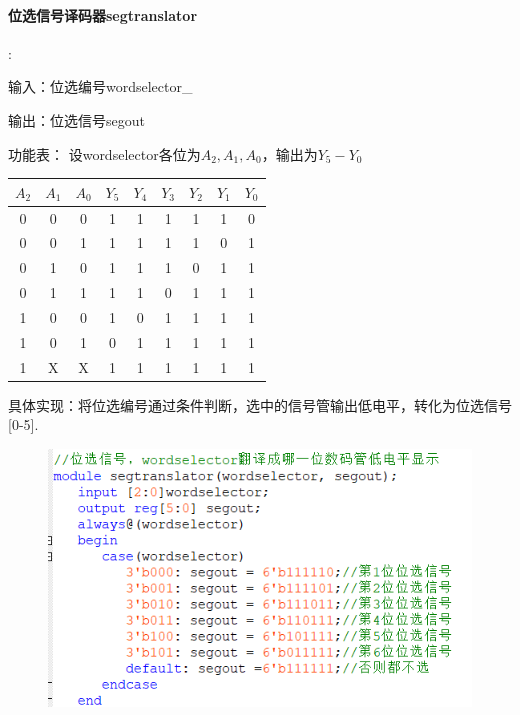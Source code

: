 \documentclass[UTF8]{ctexart}
\begin{document}
\paragraph{位选信号译码器segtranslator}:\par
输入：位选编号wordselector\_\par
输出：位选信号segout\par
功能表：
设wordselector各位为$A_2,A_1,A_0$，输出为$Y_5-Y_0$
\begin{table}[H]\begin{center}
    \begin{tabular}{c c c|c c c c c c}
        \hline
        $A_2$&$A_1$&$A_0$&$Y_5$&$Y_4$&$Y_3$&$Y_2$&$Y_1$&$Y_0$\\
        \hline
        0&0&0&1&1&1&1&1&0\\
        \hline
        0&0&1&1&1&1&1&0&1\\
        \hline
        0&1&0&1&1&1&0&1&1\\
        \hline
        0&1&1&1&1&0&1&1&1\\
        \hline
        1&0&0&1&0&1&1&1&1\\
        \hline
        1&0&1&0&1&1&1&1&1\\
        \hline
        1&X&X&1&1&1&1&1&1\\
        \hline
    \end{tabular}
    \end{center}\end{table}
具体实现：将位选编号通过条件判断，选中的信号管输出低电平，转化为位选信号[0-5].
\begin{figure}[H]\begin{center}
    \includegraphics[scale=1]{segtranslator.PNG}
\end{center}\end{figure}
\end{document}
